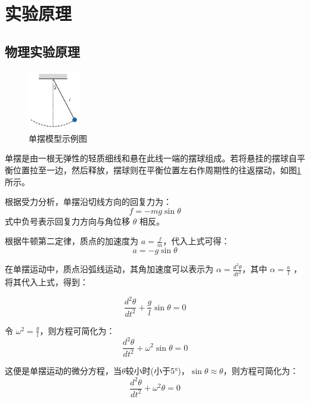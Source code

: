 \section{实验原理}
\subsection{物理实验原理}


 \begin{figure}[H]
    \centering
    \includegraphics[width=0.2\textwidth]{figures/单摆}
    \caption{单摆模型示例图}
    \label{单摆}
 \end{figure}

 单摆是由一根无弹性的轻质细线和悬在此线一端的摆球组成。若将悬挂的摆球自平衡位置拉至一边，然后释放，摆球则在平衡位置左右作周期性的往返摆动，如图\ref{单摆}所示。

根据受力分析，单摆沿切线方向的回复力为：
\begin{equation}
f = -mg \sin \theta
\end{equation}
式中负号表示回复力方向与角位移 $\theta$ 相反。

根据牛顿第二定律，质点的加速度为 $a = \frac{f}{m}$，代入上式可得：
\begin{equation}
a = -g \sin \theta
\end{equation}

在单摆运动中，质点沿弧线运动，其角加速度可以表示为 $\alpha = \frac{d^2\theta}{dt^2}$，其中 $\alpha=\frac{a}{l}$ ，将其代入上式，得到：

\begin{equation}
\frac{d^2\theta}{dt^2} + \frac{g}{l} \sin \theta = 0
\end{equation}

令 $\omega^2 = \frac{g}{l}$，则方程可简化为：
\begin{equation}
\frac{d^2\theta}{dt^2} + \omega^2 \sin \theta = 0
\end{equation}

这便是单摆运动的微分方程，当$\theta$较小时(小于5°)，$\sin \theta \approx \theta$，则方程可简化为：
\begin{equation}
\frac{d^2\theta}{dt^2} + \omega^2 \theta = 0
\end{equation}

